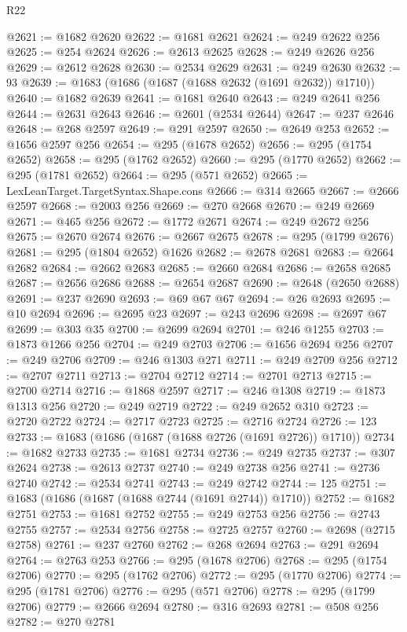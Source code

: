 \begin{lexlean}{R22}
\begin{coremodule}
@2621 := @1682 @2620
@2622 := @1681 @2621
@2624 := @249 @2622 @256
@2625 := @254 @2624
@2626 := @2613 @2625
@2628 := @249 @2626 @256
@2629 := @2612 @2628
@2630 := @2534 @2629
@2631 := @249 @2630
@2632 := 93
@2639 := @1683 (@1686 (@1687 (@1688 @2632 (@1691 @2632)) @1710))
@2640 := @1682 @2639
@2641 := @1681 @2640
@2643 := @249 @2641 @256
@2644 := @2631 @2643
@2646 := @2601 (@2534 @2644)
@2647 := @237 @2646
@2648 := @268 @2597
@2649 := @291 @2597
@2650 := @2649 @253
@2652 := @1656 @2597 @256
@2654 := @295 (@1678 @2652)
@2656 := @295 (@1754 @2652)
@2658 := @295 (@1762 @2652)
@2660 := @295 (@1770 @2652)
@2662 := @295 (@1781 @2652)
@2664 := @295 (@571 @2652)
@2665 := LexLeanTarget.TargetSyntax.Shape.cons
@2666 := @314 @2665
@2667 := @2666 @2597
@2668 := @2003 @256
@2669 := @270 @2668
@2670 := @249 @2669
@2671 := @465 @256
@2672 := @1772 @2671
@2674 := @249 @2672 @256
@2675 := @2670 @2674
@2676 := @2667 @2675
@2678 := @295 (@1799 @2676)
@2681 := @295 (@1804 @2652) @1626
@2682 := @2678 @2681
@2683 := @2664 @2682
@2684 := @2662 @2683
@2685 := @2660 @2684
@2686 := @2658 @2685
@2687 := @2656 @2686
@2688 := @2654 @2687
@2690 := @2648 (@2650 @2688)
@2691 := @237 @2690
@2693 := @69 @67 @67
@2694 := @26 @2693
@2695 := @10 @2694
@2696 := @2695 @23
@2697 := @243 @2696
@2698 := @2697 @67
@2699 := @303 @35
@2700 := @2699 @2694
@2701 := @246 @1255
@2703 := @1873 @1266 @256
@2704 := @249 @2703
@2706 := @1656 @2694 @256
@2707 := @249 @2706
@2709 := @246 @1303 @271
@2711 := @249 @2709 @256
@2712 := @2707 @2711
@2713 := @2704 @2712
@2714 := @2701 @2713
@2715 := @2700 @2714
@2716 := @1868 @2597
@2717 := @246 @1308
@2719 := @1873 @1313 @256
@2720 := @249 @2719
@2722 := @249 @2652 @310
@2723 := @2720 @2722
@2724 := @2717 @2723
@2725 := @2716 @2724
@2726 := 123
@2733 := @1683 (@1686 (@1687 (@1688 @2726 (@1691 @2726)) @1710))
@2734 := @1682 @2733
@2735 := @1681 @2734
@2736 := @249 @2735
@2737 := @307 @2624
@2738 := @2613 @2737
@2740 := @249 @2738 @256
@2741 := @2736 @2740
@2742 := @2534 @2741
@2743 := @249 @2742
@2744 := 125
@2751 := @1683 (@1686 (@1687 (@1688 @2744 (@1691 @2744)) @1710))
@2752 := @1682 @2751
@2753 := @1681 @2752
@2755 := @249 @2753 @256
@2756 := @2743 @2755
@2757 := @2534 @2756
@2758 := @2725 @2757
@2760 := @2698 (@2715 @2758)
@2761 := @237 @2760
@2762 := @268 @2694
@2763 := @291 @2694
@2764 := @2763 @253
@2766 := @295 (@1678 @2706)
@2768 := @295 (@1754 @2706)
@2770 := @295 (@1762 @2706)
@2772 := @295 (@1770 @2706)
@2774 := @295 (@1781 @2706)
@2776 := @295 (@571 @2706)
@2778 := @295 (@1799 @2706)
@2779 := @2666 @2694
@2780 := @316 @2693
@2781 := @508 @256
@2782 := @270 @2781

\end{coremodule}
\end{lexlean}
